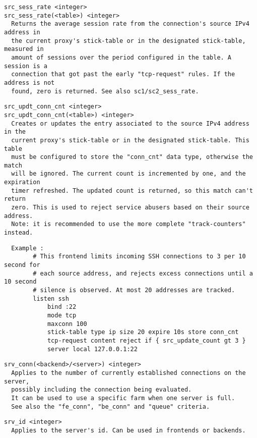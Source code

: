 \begin{verbatim}
src_sess_rate <integer>
src_sess_rate(<table>) <integer>
  Returns the average session rate from the connection's source IPv4 address in
  the current proxy's stick-table or in the designated stick-table, measured in
  amount of sessions over the period configured in the table. A session is a
  connection that got past the early "tcp-request" rules. If the address is not
  found, zero is returned. See also sc1/sc2_sess_rate.
\end{verbatim}

\begin{verbatim}
src_updt_conn_cnt <integer>
src_updt_conn_cnt(<table>) <integer>
  Creates or updates the entry associated to the source IPv4 address in the
  current proxy's stick-table or in the designated stick-table. This table
  must be configured to store the "conn_cnt" data type, otherwise the match
  will be ignored. The current count is incremented by one, and the expiration
  timer refreshed. The updated count is returned, so this match can't return
  zero. This is used to reject service abusers based on their source address.
  Note: it is recommended to use the more complete "track-counters" instead.
\end{verbatim}

\begin{verbatim}
  Example :
        # This frontend limits incoming SSH connections to 3 per 10 second for
        # each source address, and rejects excess connections until a 10 second
        # silence is observed. At most 20 addresses are tracked.
        listen ssh
            bind :22
            mode tcp
            maxconn 100
            stick-table type ip size 20 expire 10s store conn_cnt
            tcp-request content reject if { src_update_count gt 3 }
            server local 127.0.0.1:22
\end{verbatim}

\begin{verbatim}
srv_conn(<backend>/<server>) <integer>
  Applies to the number of currently established connections on the server,
  possibly including the connection being evaluated.
  It can be used to use a specific farm when one server is full.
  See also the "fe_conn", "be_conn" and "queue" criteria.
\end{verbatim}

\begin{verbatim}
srv_id <integer>
  Applies to the server's id. Can be used in frontends or backends.
\end{verbatim}

